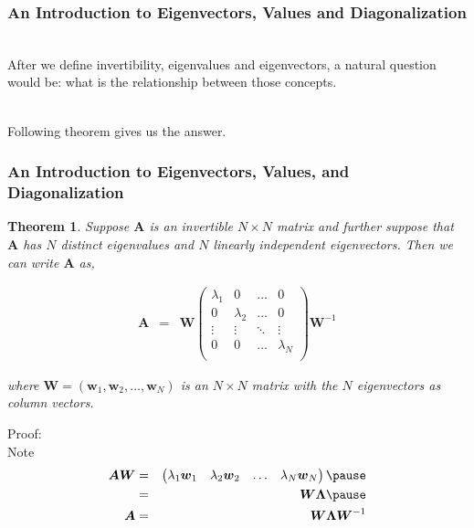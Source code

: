 \documentclass{beamer}
\newtheorem{thm}{Theorem}
\numberwithin{equation}{section}
\begin{document}
\begin{frame}
\frametitle{An Introduction to Eigenvectors, Values and Diagonalization}

\ \\After we define invertibility, eigenvalues and eigenvectors, a natural question would be: what is the relationship between those concepts. \pause 

\ \\Following theorem gives us the answer.

\end{frame}

\begin{frame}
\frametitle{An Introduction to Eigenvectors, Values, and Diagonalization}

\begin{thm}
Suppose $\boldsymbol{A}$ is an invertible $N \times N$ matrix and further suppose that $\boldsymbol{A}$ has $N$ distinct eigenvalues and $N$ linearly independent eigenvectors.  Then we can write $\boldsymbol{A}$ as, 

\begin{eqnarray}
\boldsymbol{A} &= & \boldsymbol{W}\begin{pmatrix}
\lambda_{1} & 0 & \hdots & 0 \\
0 & \lambda_{2} & \hdots & 0 \\
\vdots & \vdots & \ddots & \vdots \\
0 & 0&  \hdots & \lambda_{N}\\
\end{pmatrix}
\boldsymbol{W}^{-1} \nonumber 
\end{eqnarray}

where $\boldsymbol{W} = \left(\boldsymbol{w}_{1}, \boldsymbol{w}_{2}, \hdots, \boldsymbol{w}_{N} \right)$ is an $N \times N$ matrix with the $N$ eigenvectors as column vectors.  

\end{thm}

\end{frame}


\begin{frame}
Proof:\\

Note
\begin{eqnarray}
\boldsymbol{A}\boldsymbol{W} & = & \begin{pmatrix} \lambda_{1} \boldsymbol{w}_{1} &  \lambda_{2} \boldsymbol{w}_{2}  & \hdots  & \lambda_{N} \boldsymbol{w}_{N} \end{pmatrix} \nonumber \pause \\ 
& = & \boldsymbol{W}\boldsymbol{\Lambda} \nonumber \pause \\
\boldsymbol{A} & = & \boldsymbol{W}\boldsymbol{\Lambda} \boldsymbol{W}^{-1} \nonumber 
\end{eqnarray}

\end{frame}
\end{document}
